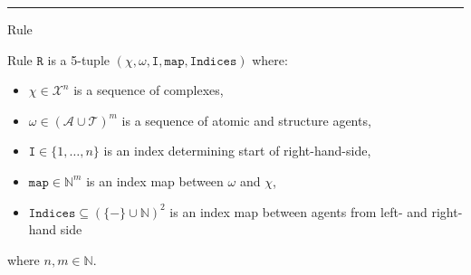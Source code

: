 \documentclass[12pt]{fithesis2}
\begin{document}
\noindent\rule{\textwidth}{1pt}

\begin{definition}{Rule}

Rule $\mathtt{R}$ is a 5-tuple $(\chi, \omega, \mathtt{I}, \mathtt{map}, \mathtt{Indices})$ where:

\begin{itemize}
\item $\chi \in \mathcal{X}^n$ is a sequence of complexes,
\item $\omega \in (\mathcal{A} \cup \mathcal{T})^m$ is a sequence of atomic and structure agents,
\item $\mathtt{I} \in \{ 1, \ldots, n \}$ is an index determining start of right-hand-side,
\item $\mathtt{map} \in \mathbb{N}^m$ is an index map between $\omega$ and $\chi$,
\item $\mathtt{Indices} \subseteq (\{-\} \cup \mathbb{N})^2$ is an index map between agents from left- and right-hand side
\end{itemize}

where $n, m \in \mathbb{N}$.
\end{definition}
\end{document}
